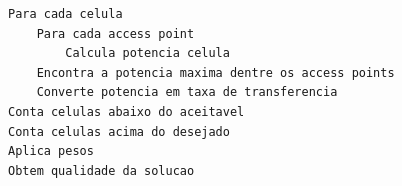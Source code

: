 \documentclass[tc,twoside]{iiufrgs}
\begin{document}
\begin{lstlisting}[caption=Algoritmo cálculo da qualidade canônico, label=algCalQual]
Para cada celula
	Para cada access point
		Calcula potencia celula
	Encontra a potencia maxima dentre os access points
	Converte potencia em taxa de transferencia
Conta celulas abaixo do aceitavel
Conta celulas acima do desejado
Aplica pesos
Obtem qualidade da solucao
\end{lstlisting}

\end{document}

